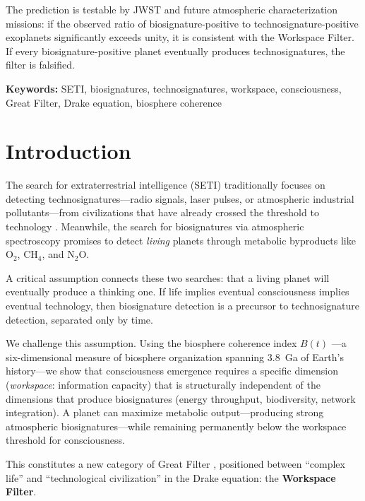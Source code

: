 \documentclass[10pt,letterpaper]{article}
\newcommand{\bt}{$B(t)$}
\begin{document}
The prediction is testable by JWST and future atmospheric
characterization missions: if the observed ratio of biosignature-positive
to technosignature-positive exoplanets significantly exceeds unity,
it is consistent with the Workspace Filter. If every biosignature-positive
planet eventually produces technosignatures, the filter is falsified.

\noindent\textbf{Keywords:} SETI, biosignatures, technosignatures,
workspace, consciousness, Great Filter, Drake equation, biosphere
coherence

\linenumbers

\section*{Introduction}

The search for extraterrestrial intelligence (SETI) traditionally focuses
on detecting technosignatures---radio signals, laser pulses, or
atmospheric industrial pollutants---from civilizations that have already
crossed the threshold to technology \cite{tarter2001}. Meanwhile, the
search for biosignatures via atmospheric spectroscopy \cite{seager2016,
schwieterman2018} promises to detect \emph{living} planets through
metabolic byproducts like $\text{O}_2$, $\text{CH}_4$, and
$\text{N}_2\text{O}$.

A critical assumption connects these two searches: that a living planet
will eventually produce a thinking one. If life implies eventual
consciousness implies eventual technology, then biosignature detection
is a precursor to technosignature detection, separated only by time.

We challenge this assumption. Using the biosphere coherence index \bt{}
\cite{stoltz2026bt}---a six-dimensional measure of biosphere
organization spanning 3.8~Ga of Earth's history---we show that
consciousness emergence requires a specific dimension (\emph{workspace}:
information capacity) that is structurally independent of the dimensions
that produce biosignatures (energy throughput, biodiversity, network
integration). A planet can maximize metabolic output---producing strong
atmospheric biosignatures---while remaining permanently below the
workspace threshold for consciousness.

This constitutes a new category of Great Filter \cite{hanson1998},
positioned between ``complex life'' and ``technological civilization''
in the Drake equation: the \textbf{Workspace Filter}.
\end{document}
